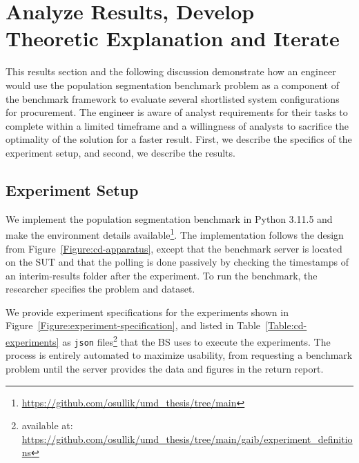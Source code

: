 \section{Analyze Results, Develop Theoretic Explanation and Iterate}
\label{section:56-CD-Results}
This results section and the following discussion demonstrate how an engineer would use the population segmentation benchmark problem as a component of the \gai benchmark framework to evaluate several shortlisted system configurations for procurement. 
The engineer is aware of analyst requirements for their \gai tasks to complete within a limited timeframe and a willingness of analysts to sacrifice the optimality of the solution for a faster result.
First, we describe the specifics of the experiment setup, and second, we describe the results. 

\subsection{Experiment Setup}
We implement the \gai population segmentation benchmark in Python 3.11.5 and make the environment details available\footnote{\scriptsize \url{https://github.com/osullik/umd_thesis/tree/main}}.
The implementation follows the design from Figure~\ref{Figure:cd-apparatus}, except that the benchmark server is located on the \ac{SUT} and that the polling is done passively by checking the timestamps of an interim-results folder after the experiment. 
To run the benchmark, the researcher specifies the problem and dataset. 



We provide experiment specifications for the experiments shown in Figure~\ref{Figure:experiment-specification}, and listed in Table~\ref{Table:cd-experiments} as \texttt{json} files\footnote{\scriptsize available at: \url{https://github.com/osullik/umd_thesis/tree/main/gaib/experiment_definitions}} that the \ac{BS} uses to execute the experiments. 
The process is entirely automated to maximize usability, from requesting a benchmark problem until the server provides the data and figures in the return report.

